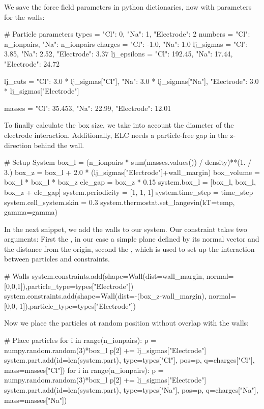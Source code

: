 \documentclass[
a4paper,                        %
11pt,                           %
twoside,                        %
footsepline,                    %
headsepline,                    %
headexclude,                    %
footexclude,                    %
pagesize,                       %
]{scrartcl}
\begin{document}
We save the force field parameters in python dictionaries, now with parameters for the walls:

\begin{pypresso}
# Particle parameters
types       = {"Cl":          0, "Na": 1, "Electrode": 2}
numbers     = {"Cl": n_ionpairs, "Na": n_ionpairs}
charges     = {"Cl":       -1.0, "Na": 1.0}
lj_sigmas   = {"Cl":       3.85, "Na": 2.52,  "Electrode": 3.37}
lj_epsilons = {"Cl":     192.45, "Na": 17.44, "Electrode": 24.72}

lj_cuts     = {"Cl":        3.0 * lj_sigmas["Cl"], 
               "Na":        3.0 * lj_sigmas["Na"],
               "Electrode": 3.0 * lj_sigmas["Electrode"]}

masses      = {"Cl":  35.453, "Na": 22.99, "Electrode": 12.01}
\end{pypresso}

To finally calculate the box size, we take into account the diameter of the electrode interaction.
Additionally, ELC needs a particle-free gap in the z-direction behind the wall.

\begin{pypresso}
# Setup System
box_l = (n_ionpairs * sum(masses.values()) / density)**(1. / 3.)
box_z = box_l + 2.0 * (lj_sigmas["Electrode"]+wall_margin)
box_volume = box_l * box_l * box_z
elc_gap = box_z * 0.15
system.box_l = [box_l, box_l, box_z + elc_gap]
system.periodicity = [1, 1, 1]
system.time_step = time_step
system.cell_system.skin = 0.3
system.thermostat.set_langevin(kT=temp, gamma=gamma)
\end{pypresso}

In the next snippet, we add the walls to our system. Our constraint takes two arguments: 
First the , in our case a simple plane defined by its normal vector and the distance from the origin, 
second the , which is used to set up the interaction between particles and constraints.

\begin{pypresso}
# Walls   
system.constraints.add(shape=Wall(dist=wall_margin,
            normal=[0,0,1]),particle_type=types["Electrode"])
system.constraints.add(shape=Wall(dist=-(box_z-wall_margin),
            normal=[0,0,-1]),particle_type=types["Electrode"])
\end{pypresso}

Now we place the particles at random position without overlap with the walls:

\begin{pypresso}
# Place particles
for i in range(n_ionpairs):
    p = numpy.random.random(3)*box_l
    p[2] += lj_sigmas["Electrode"]
    system.part.add(id=len(system.part), type=types["Cl"],  pos=p, q=charges["Cl"], mass=masses["Cl"])
for i in range(n_ionpairs):
    p = numpy.random.random(3)*box_l
    p[2] += lj_sigmas["Electrode"]
    system.part.add(id=len(system.part), type=types["Na"],  pos=p, q=charges["Na"], mass=masses["Na"])
\end{pypresso}
\end{document}
